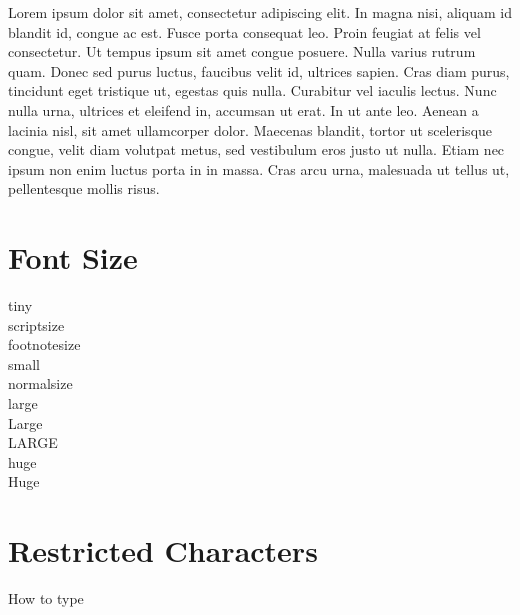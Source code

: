 \documentclass[12pt]{article}
\begin{document}
 

\flushleft
Lorem ipsum dolor sit amet, consectetur adipiscing elit. In magna nisi, aliquam id blandit id, congue ac est. Fusce porta consequat leo. Proin feugiat at felis vel consectetur. Ut tempus ipsum sit amet congue posuere. Nulla varius rutrum quam. Donec sed purus luctus, faucibus velit id, ultrices sapien. Cras diam purus, tincidunt eget tristique ut, egestas quis nulla. Curabitur vel iaculis lectus. Nunc nulla urna, ultrices et eleifend in, accumsan ut erat. In ut ante leo. Aenean a lacinia nisl, sit amet ullamcorper dolor. Maecenas blandit, tortor ut scelerisque congue, velit diam volutpat metus, sed vestibulum eros justo ut nulla. Etiam nec ipsum non enim luctus porta in in massa. Cras arcu urna, malesuada ut tellus ut, pellentesque mollis risus.

\section{Font Size}

\flushleft
\tiny
tiny \\
\scriptsize
scriptsize \\
\footnotesize
footnotesize \\
\small
small\\
\normalsize
normalsize \\
\large
large \\
\Large
Large \\
\LARGE
LARGE \\
\huge
huge \\
\Huge
Huge \\


\normalsize

\section{Restricted Characters}

How to type %

\end{document}
